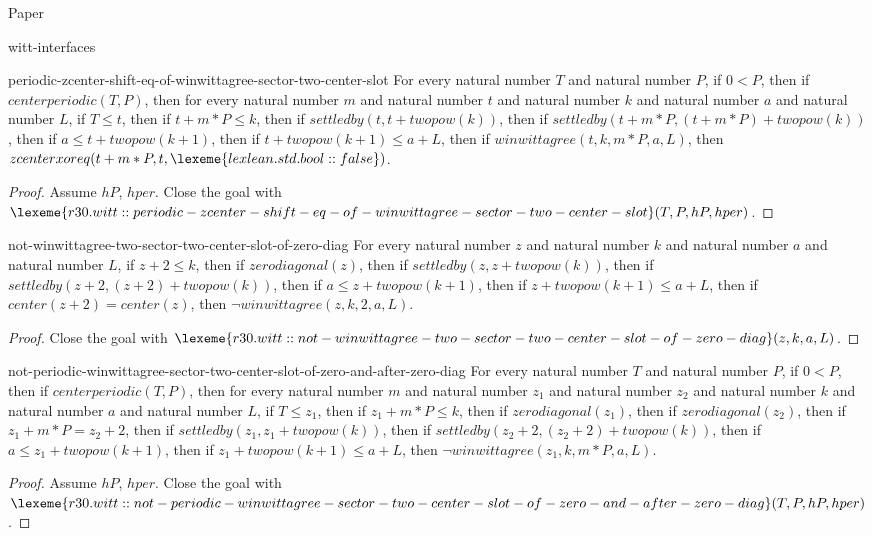 \begin{lexlean}{Paper}
\begin{section}{witt-interfaces}
  \begin{theorem}{periodic-zcenter-shift-eq-of-winwittagree-sector-two-center-slot}
  For every natural number \(T\) and natural number \(P\), if \(0 < P\), then if \(centerperiodic(T, P)\), then for every natural number \(m\) and natural number \(t\) and natural number \(k\) and natural number \(a\) and natural number \(L\), if \(T ≤ t\), then if \(t + m * P ≤ k\), then if \(settledby(t, t + twopow(k))\), then if \(settledby(t + m * P, (t + m * P) + twopow(k))\), then if \(a ≤ t + twopow(k + 1)\), then if \(t + twopow(k + 1) ≤ a + L\), then if \(winwittagree(t, k, m * P, a, L)\), then \(zcenterxoreq(t + m * P, t, \lexeme{lexlean.std.bool::false})\).
  \begin{proof}
  Assume \(hP\), \(hper\).
  Close the goal with \(\lexeme{r30.witt::periodic-zcenter-shift-eq-of-winwittagree-sector-two-center-slot}(T, P, hP, hper)\).
  \end{proof}
  \end{theorem}

  \begin{theorem}{not-winwittagree-two-sector-two-center-slot-of-zero-diag}
  For every natural number \(z\) and natural number \(k\) and natural number \(a\) and natural number \(L\), if \(z + 2 ≤ k\), then if \(zerodiagonal(z)\), then if \(settledby(z, z + twopow(k))\), then if \(settledby(z + 2, (z + 2) + twopow(k))\), then if \(a ≤ z + twopow(k + 1)\), then if \(z + twopow(k + 1) ≤ a + L\), then if \(center(z + 2) = center(z)\), then \(¬ winwittagree(z, k, 2, a, L)\).
  \begin{proof}
  Close the goal with \(\lexeme{r30.witt::not-winwittagree-two-sector-two-center-slot-of-zero-diag}(z, k, a, L)\).
  \end{proof}
  \end{theorem}

  \begin{theorem}{not-periodic-winwittagree-sector-two-center-slot-of-zero-and-after-zero-diag}
  For every natural number \(T\) and natural number \(P\), if \(0 < P\), then if \(centerperiodic(T, P)\), then for every natural number \(m\) and natural number \(z_1\) and natural number \(z_2\) and natural number \(k\) and natural number \(a\) and natural number \(L\), if \(T ≤ z_1\), then if \(z_1 + m * P ≤ k\), then if \(zerodiagonal(z_1)\), then if \(zerodiagonal(z_2)\), then if \(z_1 + m * P = z_2 + 2\), then if \(settledby(z_1, z_1 + twopow(k))\), then if \(settledby(z_2 + 2, (z_2 + 2) + twopow(k))\), then if \(a ≤ z_1 + twopow(k + 1)\), then if \(z_1 + twopow(k + 1) ≤ a + L\), then \(¬ winwittagree(z_1, k, m * P, a, L)\).
  \begin{proof}
  Assume \(hP\), \(hper\).
  Close the goal with \(\lexeme{r30.witt::not-periodic-winwittagree-sector-two-center-slot-of-zero-and-after-zero-diag}(T, P, hP, hper)\).
  \end{proof}
  \end{theorem}


\end{section}
\end{lexlean}
